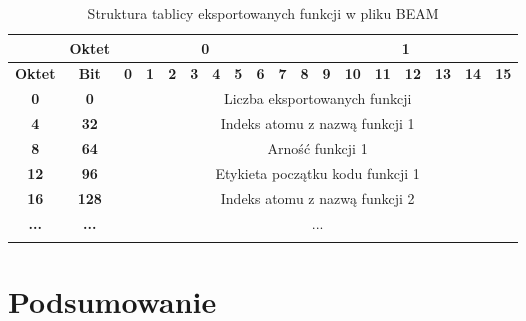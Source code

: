 \begin{longtable}{|c|c|c|c|c|c|c|c|c|c|c|c|c|c|c|c|c|c|}
\hline
         & \textbf{Oktet} & \multicolumn{8}{|c|}{\textbf{0}} & \multicolumn{8}{|c|}{\textbf{1}} \\
\hline
\textbf{Oktet} & \textbf{Bit} & \textbf{0} & \textbf{1} & \textbf{2} & \textbf{3} & \textbf{4} & \textbf{5} & \textbf{6} & \textbf{7} & \textbf{8} & \textbf{9} & \textbf{10} & \textbf{11} & \textbf{12} & \textbf{13} & \textbf{14} & \textbf{15}\\
\hline
\textbf{0} & \textbf{0} & \multicolumn{16}{|c|}{Liczba eksportowanych funkcji} \\[2ex]
\hline
\textbf{4} & \textbf{32} & \multicolumn{16}{|c|}{Indeks atomu z nazwą funkcji 1}\\[2ex]
\hline
\textbf{8} & \textbf{64} & \multicolumn{16}{|c|}{Arność funkcji 1} \\[2ex]
\hline
\textbf{12} & \textbf{96} & \multicolumn{16}{|c|}{Etykieta początku kodu funkcji 1}\\[2ex]
\hline
\textbf{16} & \textbf{128} & \multicolumn{16}{|c|}{Indeks atomu z nazwą funkcji 2}\\[2ex]
\hline
\textbf{...} & \textbf{...} & \multicolumn{16}{|c|}{...}  \\[10ex]
\hline
\caption{Struktura tablicy eksportowanych funkcji w pliku BEAM}
\label{table:exporttable} \\
\end{longtable}

\section{Podsumowanie}
